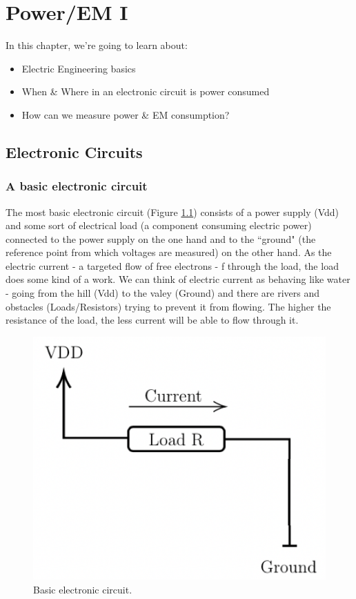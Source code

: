 \chapter{Power/EM I} \label{c4_forthchapter:cha}

In this chapter, we're going to learn about:
\begin{itemize}
    \item Electric Engineering basics
    \item When \& Where in an electronic circuit is power consumed
    \item How can we measure power \& EM consumption?
\end{itemize}

\section{Electronic Circuits}

\subsection{A basic electronic circuit}

The most basic electronic circuit (Figure \ref{fig:basic_electronic_circuitn}) consists of a power supply (Vdd)
and some sort of electrical load (a component consuming electric power)
connected to the power supply on the one hand and to the ``ground" (the reference point from which
voltages are measured) on the other hand. As the electric current - a targeted flow of free electrons -
f through the load, the load does some kind of a work. We can think of electric
current as behaving like water - going from the hill (Vdd) to the valey (Ground) and there are rivers and obstacles (Loads/Resistors)
trying to prevent it from flowing. The higher the resistance of the load, the less current will be able to flow through it.

\begin{figure}[!ht]
	\centering
	\includegraphics{images/basic_electronic_circuit.png}
	\caption{Basic electronic circuit.} \label{fig:basic_electronic_circuitn}
\end{figure}


